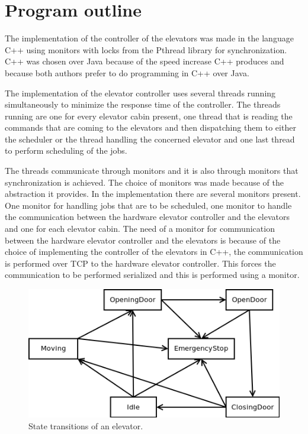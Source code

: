 \documentclass[10pt,a4paper]{article}
\begin{document}
\section{Program outline}
The implementation of the controller of the elevators was made in the language C++ using monitors with locks from the Pthread library for synchronization. C++ was chosen over Java because of the speed increase C++ produces and because both authors prefer to do programming in C++ over Java.

The implementation of the elevator controller uses several threads running simultaneously to minimize the response time of the controller. The threads running are one for every elevator cabin present, one thread that is reading the commands that are coming to the elevators and then dispatching them to either the scheduler or the thread handling the concerned elevator and one last thread to perform scheduling of the jobs.

The threads communicate through monitors and it is also through monitors that synchronization is achieved. The choice of monitors was made because of the abstraction it provides. In the implementation there are several monitors present. One monitor for handling jobs that are to be scheduled, one monitor to handle the communication between the hardware elevator controller and the elevators and one for each elevator cabin. The need of a monitor for communication between the hardware elevator controller and the elevators is because of the choice of implementing the controller of the elevators in C++, the communication is performed over TCP to the hardware elevator controller. This forces the communication to be performed serialized and this is performed using a monitor.

\begin{figure}[!h]
\centering
\includegraphics[scale=0.5]{state_transition.png}
\caption{State transitions of an elevator.}
\label{fig:states}
\end{figure}
\end{document}
